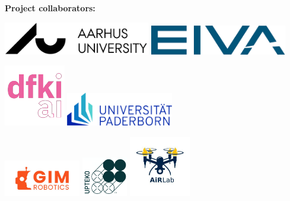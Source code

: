 \newpage

\vspace{5ex}

{\Large \textbf{Project collaborators:}} 

\vspace{7ex}

\begin{center}

\includegraphics[width=0.48\textwidth, valign=c]{figs/logos/AUblack.pdf}
\hspace{5ex}
\includegraphics[width=0.45\textwidth, valign=c]{figs/logos/eivalogo.png}

\vspace{5ex}

\includegraphics[width=0.2\textwidth, valign=c]{Phd_thesis/figs/logos/dfki.png}
\hspace{14ex}
\includegraphics[width=0.35\textwidth, valign=c]{Phd_thesis/figs/logos/pad.png}


\vspace{2ex}

\includegraphics[width=0.25\textwidth, valign=c]{figs/logos/gim.jpg}
\hfill
\includegraphics[width=0.15\textwidth, valign=c]{Phd_thesis/figs/logos/upteko.png}
\hfill
\includegraphics[width=0.20\textwidth, valign=c]{Phd_thesis/figs/logos/airlab.jpg}



\end{center}
